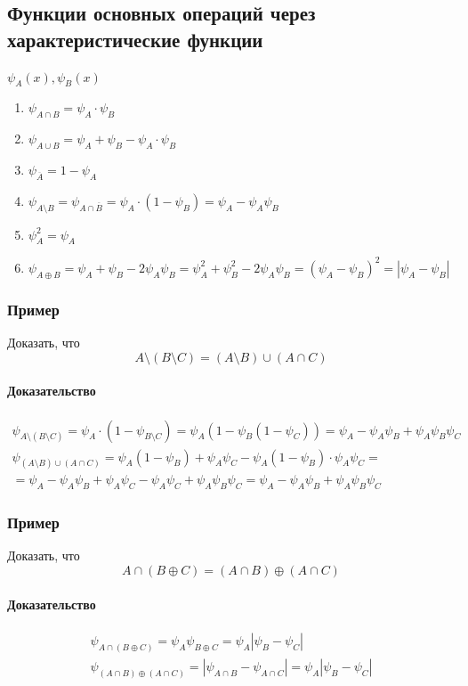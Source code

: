 \documentclass{article}
\begin{document}
\subsection{Функции основных операций через характеристические функции}
$\psi_A(x), \psi_B(x)$
\begin{enumerate}
    \item $\psi_{A \cap B} = \psi_A \cdot \psi_B$
    \item $\psi_{A \cup B} = \psi_A + \psi_B - \psi_A \cdot \psi_B$
    \item $\psi_{\overline{A}} = 1 - \psi_A$
    \item $\psi_{A \setminus B} = \psi_{A \cap \overline{B}} = \psi_A \cdot (1 - \psi_B) = \psi_A - \psi_A \psi_B$
    \item $\psi^2_A = \psi_A$
    \item $\psi_{A \oplus B} = \psi_A + \psi_B - 2 \psi_A \psi_B = \psi^2_A + \psi^2_B - 2 \psi_A \psi_B = (\psi_A - \psi_B)^2 = |\psi_A - \psi_B|$
\end{enumerate}

\subsubsection{Пример}
Доказать, что
\[
    A \setminus (B \setminus C) = (A \setminus B) \cup (A \cap C)
\]

\paragraph{Доказательство}
\begin{gather*}
    \psi_{A \setminus (B \setminus C)} = 
    \psi_A \cdot (1 - \psi_{B \setminus C}) = 
    \psi_A (1 - \psi_B (1 - \psi_C)) =
    \psi_A - \psi_A \psi_B + \psi_A \psi_B \psi_C \\
    \psi_{(A \setminus B) \cup (A \cap C)} = 
    \psi_A (1 - \psi_B) + \psi_A \psi_C - \psi_A (1 - \psi_B) \cdot \psi_A \psi_C = \\
    = \psi_A - \psi_A \psi_B + \psi_A \psi_C - \psi_A \psi_C + \psi_A \psi_B \psi_C = \psi_A - \psi_A \psi_B + \psi_A \psi_B \psi_C
\end{gather*}


\subsubsection{Пример}
Доказать, что
\[
    A \cap (B \oplus C) = (A \cap B) \oplus (A \cap C)
\]

\paragraph{Доказательство}
\begin{gather*}
    \psi_{A \cap (B \oplus C)} = \psi_A \psi_{B \oplus C} = \psi_A |\psi_B - \psi_C| \\
    \psi_{(A \cap B) \oplus (A \cap C)} = |\psi_{A \cap B} - \psi_{A \cap C}| = \psi_A |\psi_B - \psi_C|
\end{gather*}
\end{document}
